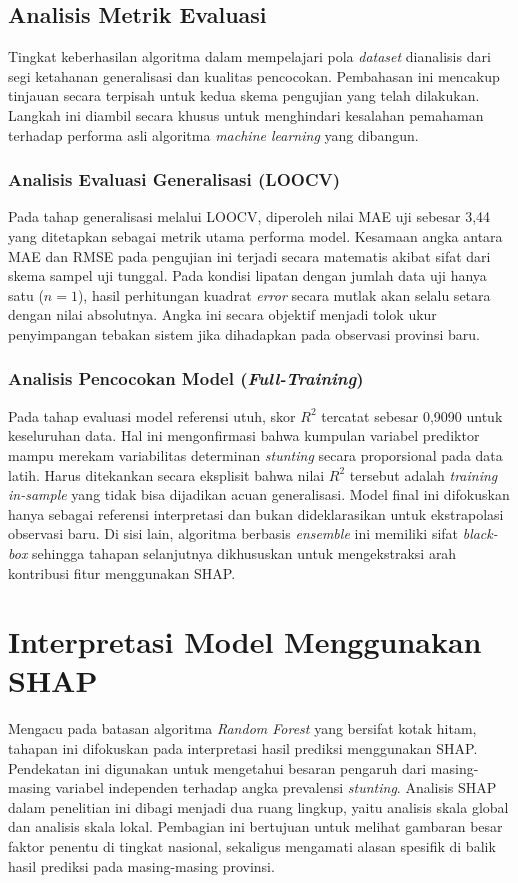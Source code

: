 \subsection{Analisis Metrik Evaluasi}
Tingkat keberhasilan algoritma dalam mempelajari pola \textit{dataset} dianalisis dari segi ketahanan generalisasi dan kualitas pencocokan. Pembahasan ini mencakup tinjauan secara terpisah untuk kedua skema pengujian yang telah dilakukan. Langkah ini diambil secara khusus untuk menghindari kesalahan pemahaman terhadap performa asli algoritma \textit{machine learning} yang dibangun.

\subsubsection{Analisis Evaluasi Generalisasi (LOOCV)}
Pada tahap generalisasi melalui LOOCV, diperoleh nilai MAE uji sebesar 3,44 yang ditetapkan sebagai metrik utama performa model. Kesamaan angka antara MAE dan RMSE pada pengujian ini terjadi secara matematis akibat sifat dari skema sampel uji tunggal. Pada kondisi lipatan dengan jumlah data uji hanya satu ($n=1$), hasil perhitungan kuadrat \textit{error} secara mutlak akan selalu setara dengan nilai absolutnya. Angka ini secara objektif menjadi tolok ukur penyimpangan tebakan sistem jika dihadapkan pada observasi provinsi baru.

\subsubsection{Analisis Pencocokan Model (\textit{Full-Training})}
Pada tahap evaluasi model referensi utuh, skor $R^2$ tercatat sebesar 0,9090 untuk keseluruhan data. Hal ini mengonfirmasi bahwa kumpulan variabel prediktor mampu merekam variabilitas determinan \textit{stunting} secara proporsional pada data latih. Harus ditekankan secara eksplisit bahwa nilai $R^2$ tersebut adalah \textit{training in-sample} yang tidak bisa dijadikan acuan generalisasi. Model final ini difokuskan hanya sebagai referensi interpretasi dan bukan dideklarasikan untuk ekstrapolasi observasi baru. Di sisi lain, algoritma berbasis \textit{ensemble} ini memiliki sifat \textit{black-box} sehingga tahapan selanjutnya dikhususkan untuk mengekstraksi arah kontribusi fitur menggunakan SHAP.

\section{Interpretasi Model Menggunakan SHAP}
Mengacu pada batasan algoritma \textit{Random Forest} yang bersifat kotak hitam, tahapan ini difokuskan pada interpretasi hasil prediksi menggunakan SHAP. Pendekatan ini digunakan untuk mengetahui besaran pengaruh dari masing-masing variabel independen terhadap angka prevalensi \textit{stunting}. Analisis SHAP dalam penelitian ini dibagi menjadi dua ruang lingkup, yaitu analisis skala global dan analisis skala lokal. Pembagian ini bertujuan untuk melihat gambaran besar faktor penentu di tingkat nasional, sekaligus mengamati alasan spesifik di balik hasil prediksi pada masing-masing provinsi.

